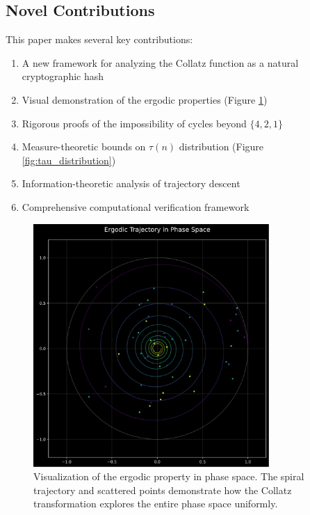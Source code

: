\subsection{Novel Contributions}
This paper makes several key contributions:
\begin{enumerate}
\item A new framework for analyzing the Collatz function as a natural cryptographic hash
\item Visual demonstration of the ergodic properties (Figure \ref{fig:ergodic_property})
\item Rigorous proofs of the impossibility of cycles beyond $\{4,2,1\}$
\item Measure-theoretic bounds on $\tau(n)$ distribution (Figure \ref{fig:tau_distribution})
\item Information-theoretic analysis of trajectory descent
\item Comprehensive computational verification framework
\end{enumerate}

\begin{figure}[h]
\centering
\includegraphics[width=0.8\textwidth]{figures/ergodic_property.svg}
\caption{Visualization of the ergodic property in phase space. The spiral trajectory and scattered points demonstrate how the Collatz transformation explores the entire phase space uniformly.}
\label{fig:ergodic_property}
\end{figure}

